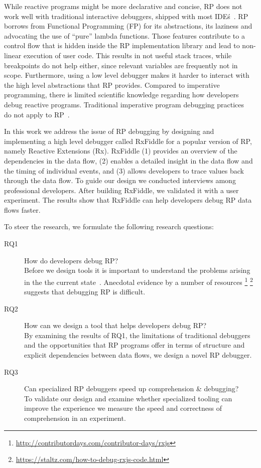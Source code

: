 While reactive programs might be more declarative and concise, RP does
not work well with traditional interactive debuggers, shipped with most
IDE\'s~\cite{salvaneschi2016debugging}.  RP borrows from Functional
Programming (FP) for its abstractions, its laziness and advocating the
use of ``pure'' lambda functions.  Those features contribute to a
control flow that is hidden inside the RP implementation library and
lead to non-linear execution of user code.  This results in not useful
stack traces, while breakpoints do not help either, since relevant variables
are frequently not in scope.  Furthermore, using a low level debugger makes
it harder to interact with the high level abstractions that RP provides.
Compared to imperative programming, there is limited scientific
knowledge regarding how developers debug reactive programs.  Traditional
imperative program debugging practices~\cite{beller2017behavior} do not
apply to RP~\cite{salvaneschi2016debugging}.

In this work we address the issue of RP debugging by designing and
implementing a high level debugger called RxFiddle for a popular version
of RP, namely Reactive Extensions (Rx).  RxFiddle (1) provides an
overview of the dependencies in the data flow, (2) enables a detailed
insight in the data flow and the timing of individual events, and (3)
allows developers to trace values back through the data flow.  To guide
our design we conducted interviews among professional developers.  After
building RxFiddle, we validated it with a user experiment.  The results
show that RxFiddle can help developers debug RP data flows faster.

To steer the research, we formulate the following research questions:

\begin{description}
    \item[RQ1]
        How do developers debug RP?  \\
        Before we design tools it is important to understand the
        problems arising in the the current state~\cite{singer2010examination}.
        Anecdotal evidence by a number of resources%
        \footnote{%
        \label{foot:contribdays}\url{http://contributordays.com/contributor-days/rxjs}}%
        \footnote{\url{https://staltz.com/how-to-debug-rxjs-code.html}}
        suggests that debugging RP is difficult.

    \item[RQ2]
        How can we design a tool that helps developers debug RP?  \\
        By examining the results of RQ1, the limitations of traditional
        debuggers and the opportunities that RP programs offer in terms
        of structure and explicit dependencies between data flows, we
        design a novel RP debugger.

    \item[RQ3]
        Can specialized RP debuggers speed up comprehension \&
        debugging?  \\
        To validate our design and examine whether specialized tooling
        can improve the experience we measure the speed and correctness
        of comprehension in an experiment.

\end{description}

